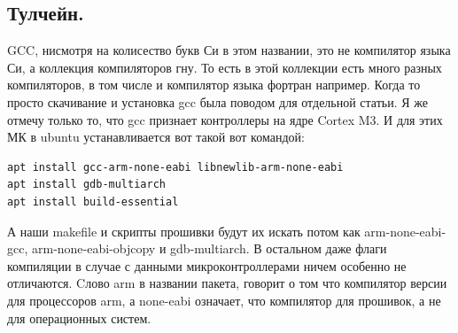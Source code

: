 \documentclass[12pt,a4paper]{article}
\begin{document}
\subsection{Тулчейн.}
    GCC, нисмотря на колисество букв Си в этом названии, это не компилятор
    языка Си, а коллекция компиляторов гну. То есть в этой коллекции есть много
    разных компиляторов, в том числе и компилятор языка фортран например.
    Когда то просто скачивание и установка gcc была поводом для отдельной статьи.
    Я же отмечу только то, что gcc признает контроллеры на ядре Cortex M3. И
    для этих МК в ubuntu устанавливается вот такой вот командой:
\begin{lstlisting}
apt install gcc-arm-none-eabi libnewlib-arm-none-eabi
apt install gdb-multiarch
apt install build-essential
\end{lstlisting}
    А наши makefile и скрипты прошивки будут их искать потом как
    arm-none-eabi-gcc, arm-none-eabi-objcopy и gdb-multiarch.
    В остальном даже флаги компиляции в случае с данными микроконтроллерами
    ничем особенно не отличаются. Cлово arm в названии пакета, говорит о том что
    компилятор версии для процессоров arm, а none-eabi означает, что компилятор
    для прошивок, а не для операционных систем.
\end{document}
